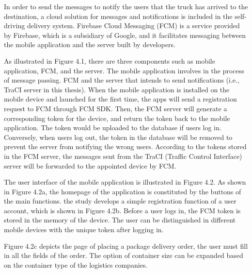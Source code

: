 \documentclass[12pt]{ksthesis}
\begin{document}
\begin{thesis}
{In order to send the messages to notify the users that the truck has arrived to the destination, a cloud solution for messages and notifications is included in the self-driving delivery system. Firebase Cloud Messaging (FCM) is a service provided by Firebase, which is a subsidiary of Google, and it facilitates messaging between the mobile application and the server built by developers. 

As illustrated in Figure 4.1, there are three components such as mobile application, FCM, and the server. The mobile application involves in the process of message passing.
FCM and the server that intends to send notifications (i.e., TraCI server in this thesis). 
When the mobile application is installed on the mobile device and launched for the first time, the apps will send a registration request to FCM through FCM SDK. Then, the FCM server will generate a corresponding token for the device, and return the token back to the mobile application. The token would be uploaded to the database if users log in. Conversely, when users log out, the token in the database will be removed to prevent the server from notifying the wrong users. According to the tokens stored in the FCM server, the messages sent from the TraCI (Traffic Control Interface) server will be forwarded to the appointed device by FCM.


The user interface of the mobile application is illustrated in Figure 4.2. As shown in Figure 4.2a, the homepage of the application is constituted by the buttons of the main functions. the study develops a simple registration function of a user account, which is shown in Figure 4.2b. 
Before a user logs in, the FCM token is stored in the memory of the device. The user can be distinguished in different mobile devices with the unique token after logging in.
 
Figure 4.2c depicts the page of placing a package delivery order, the user must fill in all the fields of the order. The option of container size can be expanded based on the container type of the logistics companies.



}
\end{thesis}
\end{document}
